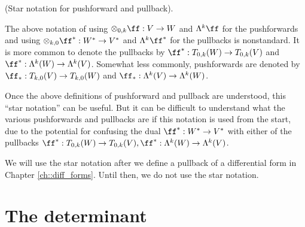 \begin{remark}
\label{ch::exterior_pwrs::rmk::star_notation_pushforward_pullback}
    (Star notation for pushforward and pullback).
    
    The above notation of using $\otimes_{0, k} \ff:V \rightarrow W$ and $\Lambda^k \ff$ for the pushforwards and using ${\otimes_{k, 0} \ff^*:W^* \rightarrow V^*}$ and $\Lambda^k \ff^*$ for the pullbacks is nonstandard. It is more common to denote the pullbacks by ${\ff^*:T_{0,k}(W) \rightarrow T_{0,k}(V)}$ and ${\ff^*:\Lambda^k(W) \rightarrow \Lambda^k(V)}$. Somewhat less commonly, pushforwards are denoted by ${\ff_*:T_{k,0}(V) \rightarrow T_{k,0}(W)}$ and ${\ff_*:\Lambda^k(V) \rightarrow \Lambda^k(W)}$.
    
    Once the above definitions of pushforward and pullback are understood, this ``star notation'' can be useful. But it can be difficult to understand what the various pushforwards and pullbacks are if this notation is used from the start, due to the potential for confusing the dual $\ff^*:W^* \rightarrow V^*$ with either of the pullbacks ${\ff^*:T_{0,k}(W) \rightarrow T_{0,k}(V)}, {\ff^*:\Lambda^k(W) \rightarrow \Lambda^k(V)}$.
    
    We will use the star notation after we define a pullback of a differential form in Chapter \ref{ch::diff_forms}. Until then, we do not use the star notation.
\end{remark}

\newpage

\section{The determinant}

\label{ch::exterior_pwrs::determinant}

